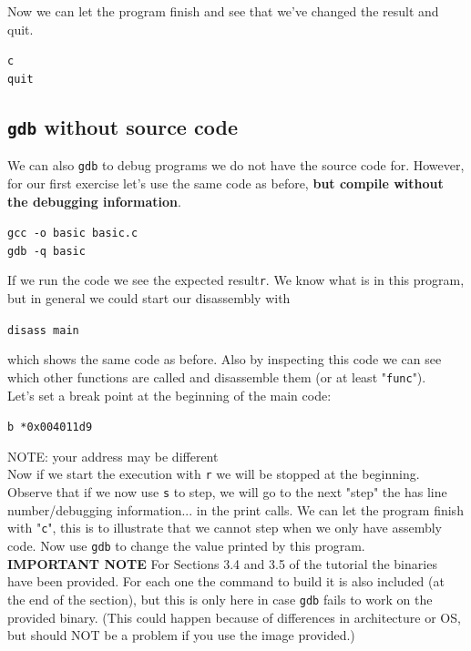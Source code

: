 \documentclass{article}
\begin{document}
\noindent Now we can let the program finish and see that we've changed the result and quit.
\begin{center}
    \lstinline{c}\\
    \lstinline{quit}
\end{center}
\subsection{\lstinline{gdb} without source code}
We can also \lstinline{gdb} to debug programs we do not have the source code for.
However, for our first exercise let's use the same code as before, \textbf{but compile
without the debugging information}.
\begin{center}
    \lstinline{gcc -o basic basic.c}\\
    \lstinline{gdb -q basic}
\end{center}
\noindent If we run the code we see the expected result\lstinline{r}. We know what is in this program, but in general we could start our disassembly with
\begin{center}
    \lstinline{disass main}
\end{center}
\noindent which shows the same code as before. Also by inspecting this code we can see which other functions are called and disassemble them (or at least "\lstinline{func}").\\

\noindent Let's set a break point at the beginning of the main code:
\begin{center}
    \lstinline{b *0x004011d9}
\end{center}
\noindent \noindent NOTE: your address may be different\\

\noindent Now if we start the
execution with \lstinline{r} we will be stopped at the beginning. Observe that if we now use \lstinline{s} to step, we will go to the next "step" the has line number/debugging information... in the print calls. We can let the program finish with "\lstinline{c}", this is to illustrate that we cannot step when we only have assembly code. Now use \lstinline{gdb} to change the value printed by this program.\\

\noindent\textbf{IMPORTANT NOTE} 
For Sections 3.4 and 3.5 of the tutorial the binaries have been provided. For
each one the command to build it is also included (at the end of the section),
but this is only here in case \lstinline{gdb} fails to work on the provided binary. (This
could happen because of differences in architecture or OS, but should NOT
be a problem if you use the image provided.)\\
\end{document}
